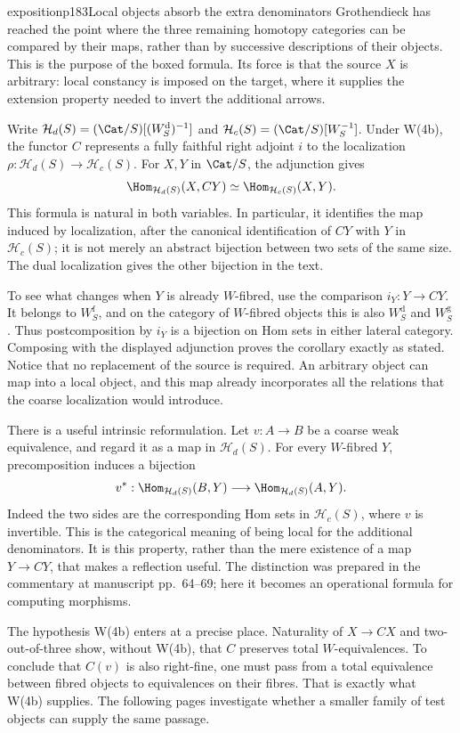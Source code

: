 \begin{dcomment}{exposition}{p183}{Local objects absorb the extra denominators}
Grothendieck has reached the point where the three remaining homotopy categories can be compared by their maps, rather than by successive descriptions of their objects. This is the purpose of the boxed formula. Its force is that the source $X$ is arbitrary: local constancy is imposed on the target, where it supplies the extension property needed to invert the additional arrows.

Write $\mathcal H_d(S)=(\Cat/S)[(W_S^{\mathrm d})^{-1}]$ and $\mathcal H_c(S)=(\Cat/S)[W_S^{-1}]$. Under W(4b), the functor $C$ represents a fully faithful right adjoint $i$ to the localization $\rho:\mathcal H_d(S)\to\mathcal H_c(S)$. For $X,Y$ in $\Cat/S$, the adjunction gives
\[
 \Hom_{\mathcal H_d(S)}(X,CY)
 \simeq \Hom_{\mathcal H_c(S)}(X,Y).
\]
This formula is natural in both variables. In particular, it identifies the map induced by localization, after the canonical identification of $CY$ with $Y$ in $\mathcal H_c(S)$; it is not merely an abstract bijection between two sets of the same size. The dual localization gives the other bijection in the text.

To see what changes when $Y$ is already $W$-fibred, use the comparison $i_Y:Y\to CY$. It belongs to $W_S^{\mathrm f}$, and on the category of $W$-fibred objects this is also $W_S^{\mathrm d}$ and $W_S^{\mathrm g}$. Thus postcomposition by $i_Y$ is a bijection on Hom sets in either lateral category. Composing with the displayed adjunction proves the corollary exactly as stated. Notice that no replacement of the source is required. An arbitrary object can map into a local object, and this map already incorporates all the relations that the coarse localization would introduce.

There is a useful intrinsic reformulation. Let $v:A\to B$ be a coarse weak equivalence, and regard it as a map in $\mathcal H_d(S)$. For every $W$-fibred $Y$, precomposition induces a bijection
\[
 v^*:\Hom_{\mathcal H_d(S)}(B,Y)
       \longrightarrow \Hom_{\mathcal H_d(S)}(A,Y).
\]
Indeed the two sides are the corresponding Hom sets in $\mathcal H_c(S)$, where $v$ is invertible. This is the categorical meaning of being local for the additional denominators. It is this property, rather than the mere existence of a map $Y\to CY$, that makes a reflection useful. The distinction was prepared in the commentary at manuscript pp.~64--69; here it becomes an operational formula for computing morphisms.

The hypothesis W(4b) enters at a precise place. Naturality of $X\to CX$ and two-out-of-three show, without W(4b), that $C$ preserves total $W$-equivalences. To conclude that $C(v)$ is also right-fine, one must pass from a total equivalence between fibred objects to equivalences on their fibres. That is exactly what W(4b) supplies. The following pages investigate whether a smaller family of test objects can supply the same passage.
\end{dcomment}

